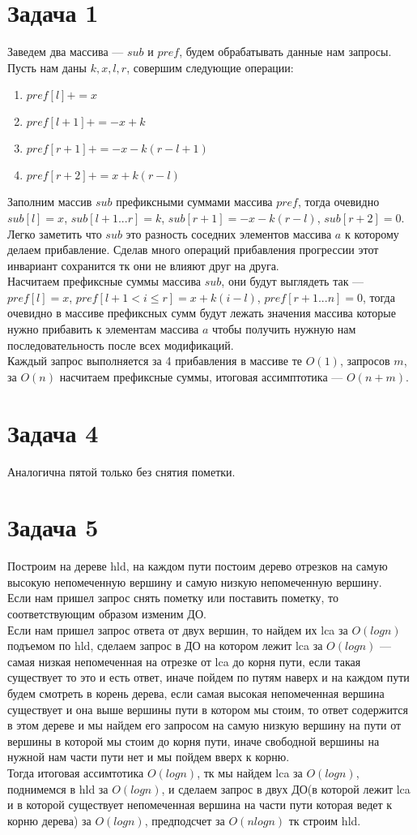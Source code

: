 \documentclass{article}
\begin{document}
 
\noindent 
\onehalfspacing  

\section{Задача 1}
Заведем два массива --- $sub$ и $pref$, будем обрабатывать данные нам запросы. Пусть нам даны $k, x, l, r$, совершим следующие операции:
\begin{enumerate}
\item
$pref[l]+=x$
\item
$pref[l+1]+=-x+k$
\item
$pref[r+1]+=-x-k(r-l+1)$
\item
$pref[r+2]+=x+k(r-l)$
\end{enumerate}
Заполним массив $sub$ префиксными суммами массива $pref$, тогда очевидно $sub[l] = x$, $sub[l + 1...r]=k$, $sub[r+1]=-x-k(r-l)$, $sub[r+2]=0$. Легко заметить что $sub$ это разность соседних элементов массива $a$ к которому делаем прибавление. Сделав много операций прибавления прогрессии этот инвариант сохранится тк они не влияют друг на друга.\\
Насчитаем префиксные суммы массива $sub$, они будут выглядеть так --- $pref[l]=x$, $pref[l+1 < i \leq r]=x+k(i-l)$, $pref[r+1...n]=0$, тогда очевидно в массиве префиксных сумм будут лежать значения массива которые нужно прибавить к элементам массива $a$ чтобы получить нужную нам последовательность после всех модификаций.\\
Каждый запрос выполняется за 4 прибавления в массиве те $O(1)$, запросов $m$, за $O(n)$ насчитаем префиксные суммы, итоговая ассимптотика --- $O(n+m)$.
\section{Задача 4}
Аналогична пятой только без снятия пометки.
\section{Задача 5}
Построим на дереве hld, на каждом пути постоим дерево отрезков на самую высокую непомеченную вершину и самую низкую непомеченную вершину.\\
Если нам пришел запрос снять пометку или поставить пометку, то соответствующим образом изменим ДО.\\
Если нам пришел запрос ответа от двух вершин, то найдем их lca за $O(logn)$ подъемом по hld, сделаем запрос в ДО на котором лежит lca за $O(logn)$ --- самая низкая непомеченная на отрезке от lca до корня пути, если такая существует то это и есть ответ, иначе пойдем по путям наверх и на каждом пути будем смотреть в корень дерева, если самая высокая непомеченная вершина существует и она выше вершины пути в котором мы стоим, то ответ содержится в этом дереве и мы найдем его запросом на самую низкую вершину на пути от вершины в которой мы стоим до корня пути, иначе свободной вершины на нужной нам части пути нет и мы пойдем вверх к корню.\\
Тогда итоговая ассимтотика $O(logn)$, тк мы найдем lca за $O(logn)$, поднимемся в hld за $O(logn)$, и сделаем запрос в двух ДО(в которой лежит lca и в которой существует непомеченная вершина на части пути которая ведет к корню дерева) за $O(logn)$, предподсчет за $O(nlogn)$ тк строим hld.
\end{document}
